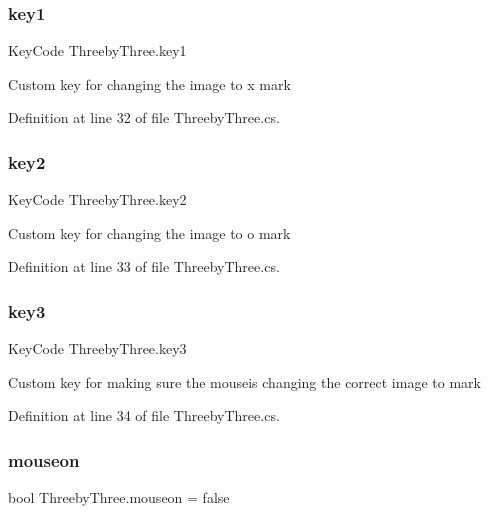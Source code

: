 \mbox{\label{class_threeby_three_a4bed81364f044a89e26c9fc4d34c214f}} 
\subsubsection{\texorpdfstring{key1}{key1}}
{\footnotesize\ttfamily Key\+Code Threeby\+Three.\+key1}

Custom key for changing the image to x mark 

Definition at line 32 of file Threeby\+Three.\+cs.

\mbox{\label{class_threeby_three_ad73590c0cf864823d41d5707303c122f}} 
\subsubsection{\texorpdfstring{key2}{key2}}
{\footnotesize\ttfamily Key\+Code Threeby\+Three.\+key2}

Custom key for changing the image to o mark 

Definition at line 33 of file Threeby\+Three.\+cs.

\mbox{\label{class_threeby_three_a756006dcc122bd940a41225d9892a6ce}} 
\subsubsection{\texorpdfstring{key3}{key3}}
{\footnotesize\ttfamily Key\+Code Threeby\+Three.\+key3}

Custom key for making sure the mouseis changing the correct image to mark 

Definition at line 34 of file Threeby\+Three.\+cs.

\mbox{\label{class_threeby_three_a298e217f694440b146df33722c29245f}} 
\subsubsection{\texorpdfstring{mouseon}{mouseon}}
{\footnotesize\ttfamily bool Threeby\+Three.\+mouseon = false}

